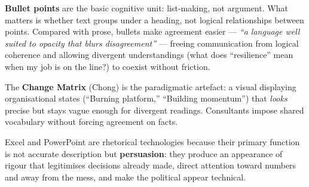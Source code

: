 \documentclass[a4paper,12pt]{article}
\begin{document}
\textbf{Bullet points} are the basic cognitive unit: list-making, not argument. What matters is whether text groups under a heading, not logical relationships between points. Compared with prose, bullets make agreement easier --- \textit{``a language well suited to opacity that blurs disagreement''} --- freeing communication from logical coherence and allowing divergent understandings (what does ``resilience'' mean when my job is on the line?) to coexist without friction.

The \textbf{Change Matrix} (Chong) is the paradigmatic artefact: a visual displaying organisational states (``Burning platform,'' ``Building momentum'') that \textit{looks} precise but stays vague enough for divergent readings. Consultants impose shared vocabulary without forcing agreement on facts.

Excel and PowerPoint are rhetorical technologies because their primary function is not accurate description but \textbf{persuasion}: they produce an appearance of rigour that legitimises decisions already made, direct attention toward numbers and away from the mess, and make the political appear technical.
\end{document}
